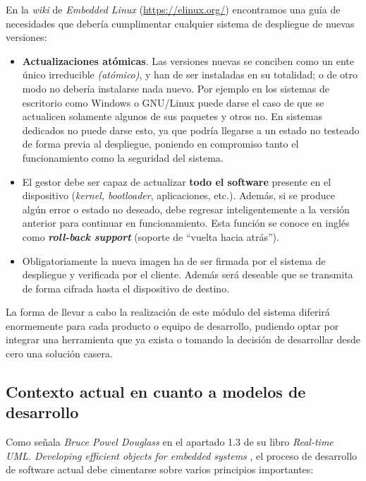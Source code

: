 En la \textit{wiki} de \textit{Embedded Linux} (\url{https://elinux.org/}) encontramos una guía de necesidades que debería cumplimentar cualquier sistema de despliegue de nuevas versiones:

\begin{itemize}
	\item \textbf{Actualizaciones atómicas}. Las versiones nuevas se conciben como un ente único irreducible \textit{(atómico)}, y han de ser instaladas en su totalidad; o de otro modo no debería instalarse nada nuevo. Por ejemplo en los sistemas de escritorio como Windows o GNU/Linux puede darse el caso de que se actualicen solamente algunos de sus paquetes y otros no. En sistemas dedicados no puede darse esto, ya que podría llegarse a un estado no testeado de forma previa al despliegue, poniendo en compromiso tanto el funcionamiento como la seguridad del sistema.
	\item El gestor debe ser capaz de actualizar \textbf{todo el software} presente en el dispositivo (\textit{kernel, bootloader}, aplicaciones, etc.). Además, si se produce algún error o estado no deseado, debe regresar inteligentemente a la versión anterior para continuar en funcionamiento. Esta función se conoce en inglés como \textbf{\textit{roll-back support}} (soporte de ``vuelta hacia atrás'').
	\item Obligatoriamente la nueva imagen ha de ser firmada por el sistema de despliegue y verificada por el cliente. Además será deseable que se transmita de forma cifrada hasta el dispositivo de destino.
\end{itemize}

La forma de llevar a cabo la realización de este módulo del sistema diferirá enormemente para cada producto o equipo de desarrollo, pudiendo optar por integrar una herramienta que ya exista o tomando la decisión de desarrollar desde cero una solución casera.\\

\subsection{Contexto actual en cuanto a modelos de desarrollo}

Como señala \textit{Bruce Powel Douglass} en el apartado 1.3 de su libro \textit{Real-time UML. Developing efficient objects for embedded systems} \cite{real-time-uml-model-based-development}, el proceso de desarrollo de software actual debe cimentarse sobre varios principios importantes:


